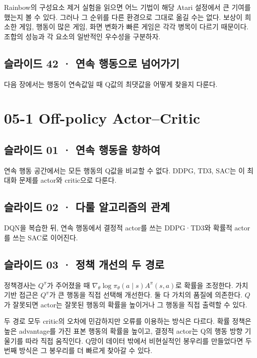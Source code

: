 \documentclass[11pt,a4paper]{article}
\begin{document}
Rainbow의 구성요소 제거 실험을 읽으면 어느 기법이 해당 Atari 설정에서 큰 기여를 했는지 볼 수 있다. 그러나 그 순위를 다른 환경으로 그대로 옮길 수는 없다. 보상이 희소한 게임, 행동이 많은 게임, 화면 변화가 빠른 게임은 각각 병목이 다르기 때문이다. 조합의 성능과 각 요소의 일반적인 우수성을 구분하자.\par

\subsection{슬라이드 42 · 연속 행동으로 넘어가기}

다음 장에서는 행동이 연속값일 때 Q값의 최댓값을 어떻게 찾을지 다룬다.\par

\clearpage
\section{05-1 Off-policy Actor–Critic}


\subsection{슬라이드 01 · 연속 행동을 향하여}

연속 행동 공간에서는 모든 행동의 Q값을 비교할 수 없다. DDPG, TD3, SAC는 이 최대화 문제를 actor와 critic으로 다룬다.\par

\subsection{슬라이드 02 · 다룰 알고리즘의 관계}

DQN을 복습한 뒤, 연속 행동에서 결정적 actor를 쓰는 DDPG·TD3와 확률적 actor를 쓰는 SAC로 이어진다.\par

\subsection{슬라이드 03 · 정책 개선의 두 경로}

정책경사는 $Q^\pi$가 주어졌을 때 $\nabla_\theta\log\pi_\theta(a\mid s)A^\pi(s,a)$로 확률을 조정한다. 가치 기반 접근은 $Q^\pi$가 큰 행동을 직접 선택해 개선한다. 둘 다 가치의 품질에 의존한다. $Q$가 잘못되면 actor는 잘못된 행동의 확률을 높이거나 그 행동을 직접 출력할 수 있다.\par

두 경로 모두 critic의 오차에 민감하지만 오류를 이용하는 방식은 다르다. 확률 정책은 높은 advantage를 가진 표본 행동의 확률을 높이고, 결정적 actor는 Q의 행동 방향 기울기를 따라 직접 움직인다. Q망이 데이터 밖에서 비현실적인 봉우리를 만들었다면 두 번째 방식은 그 봉우리를 더 빠르게 찾아갈 수 있다.\par
\end{document}
